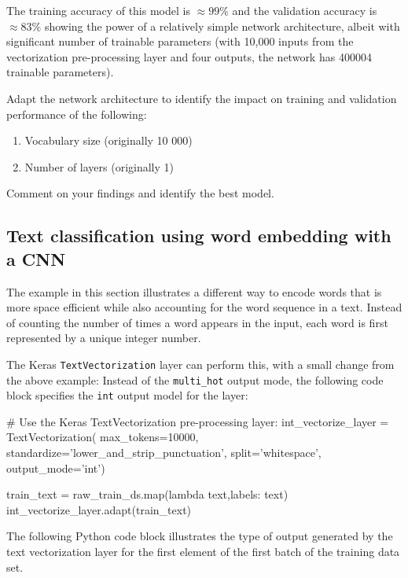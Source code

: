 The training accuracy of this model is $\approx 99\%$ and the validation accuracy is $\approx 83\%$ showing the power of a relatively simple network architecture, albeit with significant number of trainable parameters (with 10,000 inputs from the vectorization pre-processing layer and four outputs, the network has 400004 trainable parameters).

\begin{exercisebox}

Adapt the network architecture to identify the impact on training and validation performance of the following:
   \begin{enumerate}
      \item Vocabulary size (originally 10 000)
      \item Number of layers (originally 1)
   \end{enumerate}
Comment on your findings and identify the best model.
\end{exercisebox}

\subsection[Word Embedding]{Text classification using word embedding with a CNN}

The example in this section illustrates a different way to encode words that is more space efficient while also accounting for the word sequence in a text. Instead of counting the number of times a word appears in the input, each word is first represented by a unique integer number. 

The Keras \texttt{TextVectorization} layer can perform this, with a small change from the above example: Instead of the \texttt{multi\_hot} output mode, the following code block specifies the \texttt{int} output model for the layer:

\begin{pythoncode}
# Use the Keras TextVectorization pre-processing layer:
int_vectorize_layer = TextVectorization(
    max_tokens=10000,
    standardize='lower_and_strip_punctuation',
    split='whitespace',
    output_mode='int')
    
train_text = raw_train_ds.map(lambda text,labels: text)
int_vectorize_layer.adapt(train_text)
\end{pythoncode}

The following Python code block illustrates the type of output generated by the text vectorization layer for the first element of the first batch of the training data set.


